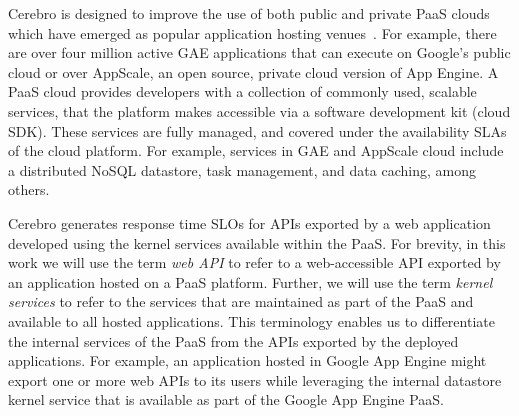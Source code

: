 
Cerebro is designed to improve the use of both public and private PaaS clouds 
which have emerged as popular application
hosting venues~\cite{paas-growth}.
For example, there are over four million active GAE
applications that 
can execute on Google's public cloud or over AppScale, an open source, private 
cloud version of App Engine.
A PaaS cloud provides developers 
with a collection of commonly used, scalable services,
that the platform makes accessible via a software 
development kit (cloud SDK).
These services are fully managed, and covered under 
the availability SLAs of the cloud platform. For example, services 
in GAE and AppScale cloud
include a distributed NoSQL datastore, task management, 
and data caching, among others. 

Cerebro generates response time SLOs for APIs exported by a web
application
developed using the kernel services available within the PaaS.  For brevity, in this work
we will use the
term \textit{web API} to refer to a web-accessible API exported by an
application hosted on a PaaS platform. Further, 
we will use the term \textit{kernel services} to refer to the services that are 
maintained as part of the PaaS and
available to all hosted applications. This terminology enables us to
differentiate the internal services of the PaaS from the 
APIs exported by the deployed applications.   
For example, an application hosted in Google App Engine might export one or
more web APIs to its users while leveraging the internal 
datastore kernel service that is available as part of the Google App Engine PaaS.

